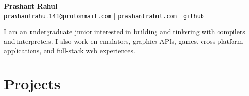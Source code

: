 \documentclass[a4paper,11pt]{article}
\begin{document}
\begin{center}
    {\huge \textbf{Prashant Rahul}} \\
    {\footnotesize \texttt{\href{mailto:prashantrahul141@protonmail.com}{prashantrahul141@protonmail.com}} | 
    \texttt{\href{https://prashantrahul.com}{prashantrahul.com}} | 
    \texttt{\href{https://github.com/prashantrahul141}{github}}} \\
\end{center}

I am an undergraduate junior interested in building and tinkering with compilers and interpreters. I also work on emulators, graphics APIs, games, cross-platform applications, and full-stack web experiences.

\section*{Projects}
\end{document}
